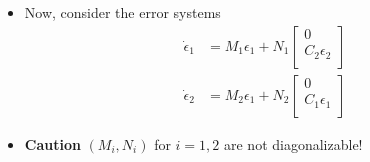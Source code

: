 \documentclass{beamer}
\begin{document}
\begin{frame}{\color{blue} }

\begin{itemize}

  \item Now, consider the error systems
\begin{align*}
\dot{\epsilon}_{1}&=M_{1}\epsilon_{1}+ N_{1}\begin{bmatrix} 0 \\ C_{2}\epsilon_{2} \\ \end{bmatrix} \\
\dot{\epsilon}_{2}&=M_{2}\epsilon_{1}+ N_{2}\begin{bmatrix} 0 \\ C_{1}\epsilon_{1} \\ \end{bmatrix}
\end{align*}

  \item {\bf\color{red}Caution}  $(M_{i},N_{i})$ for $i=1,2$ are not diagonalizable!

\end{itemize}

\end{frame}
\end{document}
